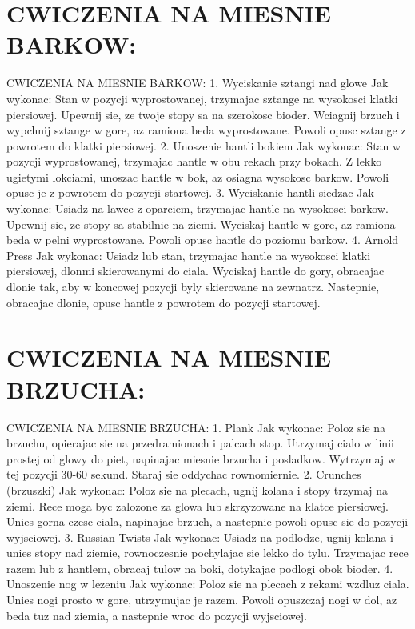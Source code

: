 \documentclass{beamer}
\begin{document}
\section{CWICZENIA NA MIESNIE BARKOW:}
\begin{frame}{CWICZENIA NA MIESNIE BARKOW:}
1. Wyciskanie sztangi nad glowe
Jak wykonac:
Stan w pozycji wyprostowanej, trzymajac sztange na wysokosci klatki piersiowej.
Upewnij sie, ze twoje stopy sa na szerokosc bioder.
Wciagnij brzuch i wypchnij sztange w gore, az ramiona beda wyprostowane.
Powoli opusc sztange z powrotem do klatki piersiowej.
2. Unoszenie hantli bokiem
Jak wykonac:
Stan w pozycji wyprostowanej, trzymajac hantle w obu rekach przy bokach.
Z lekko ugietymi lokciami, unoszac hantle w bok, az osiagna wysokosc barkow.
Powoli opusc je z powrotem do pozycji startowej.
3. Wyciskanie hantli siedzac
Jak wykonac:
Usiadz na lawce z oparciem, trzymajac hantle na wysokosci barkow.
Upewnij sie, ze stopy sa stabilnie na ziemi.
Wyciskaj hantle w gore, az ramiona beda w pelni wyprostowane.
Powoli opusc hantle do poziomu barkow.
4. Arnold Press
Jak wykonac:
Usiadz lub stan, trzymajac hantle na wysokosci klatki piersiowej, dlonmi skierowanymi do ciala.
Wyciskaj hantle do gory, obracajac dlonie tak, aby w koncowej pozycji byly skierowane na zewnatrz.
Nastepnie, obracajac dlonie, opusc hantle z powrotem do pozycji startowej.
\end{frame}
\section{CWICZENIA NA MIESNIE BRZUCHA:}
\begin{frame}{CWICZENIA NA MIESNIE BRZUCHA:}
1. Plank
Jak wykonac:
Poloz sie na brzuchu, opierajac sie na przedramionach i palcach stop.
Utrzymaj cialo w linii prostej od glowy do piet, napinajac miesnie brzucha i posladkow.
Wytrzymaj w tej pozycji 30-60 sekund.
Staraj sie oddychac rownomiernie.
2. Crunches (brzuszki)
Jak wykonac:
Poloz sie na plecach, ugnij kolana i stopy trzymaj na ziemi.
Rece moga byc zalozone za glowa lub skrzyzowane na klatce piersiowej.
Unies gorna czesc ciala, napinajac brzuch, a nastepnie powoli opusc sie do pozycji wyjsciowej.
3. Russian Twists
Jak wykonac:
Usiadz na podlodze, ugnij kolana i unies stopy nad ziemie, rownoczesnie pochylajac sie lekko do tylu.
Trzymajac rece razem lub z hantlem, obracaj tulow na boki, dotykajac podlogi obok bioder.
4. Unoszenie nog w lezeniu
Jak wykonac:
Poloz sie na plecach z rekami wzdluz ciala.
Unies nogi prosto w gore, utrzymujac je razem.
Powoli opuszczaj nogi w dol, az beda tuz nad ziemia, a nastepnie wroc do pozycji wyjsciowej.
\end{frame}
\end{document}
